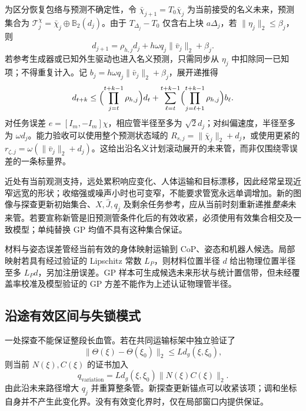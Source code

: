 \documentclass[11pt,a4paper]{article}
\numberwithin{equation}{section}
\theoremstyle{definition}
\begin{document}
为区分恢复包络与预测不确定性，令 $\bar\chi_{j+1}=T_0\bar\chi_j$ 为当前接受的名义未来，预测集合为
$\mathcal T_j^\chi=\bar\chi_j\oplus\mathbb B_2(d_j)$。由于
$T_{\Delta_j}-T_0$ 仅含右上块 $a\Delta_j$，若 $\|\eta_j\|_2\le\beta_j$，则
\begin{equation}
 \boxed{d_{j+1}=\rho_{h,j}d_j
             +h\omega q_j\|\bar v_j\|_2+\beta_j.}
 \label{eq:cal-tube-recursion}
\end{equation}
若参考生成器或已知外生驱动也进入名义预测，只需同步从 $\eta_j$ 中扣除同一已知项；不得重复计入。记 $b_j=h\omega q_j\|\bar v_j\|_2+\beta_j$，展开递推得
\begin{equation}
 d_{t+k}\le
 \Bigl(\prod_{j=t}^{t+k-1}\rho_{h,j}\Bigr)d_t+
 \sum_{\ell=t}^{t+k-1}
 \Bigl(\prod_{j=\ell+1}^{t+k-1}\rho_{h,j}\Bigr)b_\ell.
 \label{eq:cal-future-tube}
\end{equation}
对任务误差 $e=[I_m,-I_m]\chi$，相应管半径至多为 $\sqrt2d_j$；对纠偏速度，半径至多为 $\omega d_j$。能力验收可以使用整个预测状态域的 $R_{s,j}=\|\bar\chi_j\|_2+d_j$，或使用更紧的 $r_{\zeta,j}=\omega(\|\bar v_j\|_2+d_j)$。这给出沿名义计划滚动展开的未来管，而非仅围绕零误差的一条标量界。

近处有当前观测支持，远处累积响应变化、人体运输和目标漂移，因此经常呈现近窄远宽的形状；收缩强或噪声小时也可变窄，不能要求管宽永远单调增加。新的图像与探查更新初始集合、$X,\widehat J,q_j$ 及剩余任务参考，应从当前时刻重新递推\emph{整条}未来管。若要宣称新管是旧预测管条件化后的有效收紧，必须使用有效集合相交及一致模型；单纯替换 GP 均值不具有这种集合保证。

材料与姿态误差管经当前有效的身体映射运输到 CoP、姿态和机器人候选。局部映射若具有经过验证的 Lipschitz 常数 $L_P$，则材料位置半径 $d$ 给出物理位置半径至多 $L_Pd$，另加注册误差。GP 样本可生成候选未来形状与统计置信带，但未经覆盖率校准及模型验证的 GP 方差不能作为上述认证物理管半径。

\subsection{沿途有效区间与失锁模式}

一处探查不能保证整段长血管。若在共同运输标架中独立验证了
\begin{equation}
 \|\Theta(\xi)-\Theta(\xi_0)\|_2
      \le Ld_g(\xi,\xi_0),
 \label{eq:cal-spatial-variation}
\end{equation}
则当前 $N(\xi),C(\xi)$ 的证书加入
\begin{equation}
 q_{\mathrm{variation}}=
    Ld_g(\xi,\xi_0)\|N(\xi)C(\xi)\|_2.
 \label{eq:cal-variation-q}
\end{equation}
由此沿未来路径增大 $q_j$ 并重算整条管。新探查更新锚点可以收紧该项；调和坐标自身并不产生此变化界。没有有效变化界时，仅在局部窗口内提供保证。
\end{document}
